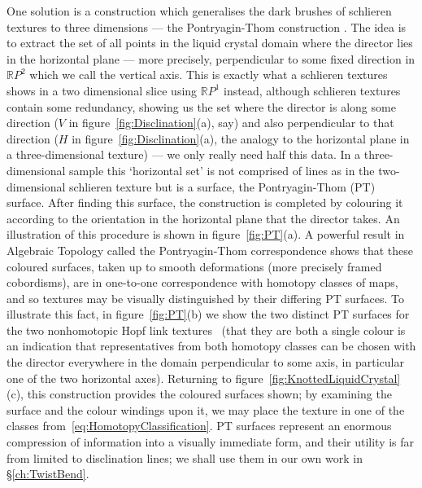 One solution is a construction which generalises the dark brushes of schlieren textures to three dimensions --- the Pontryagin-Thom construction \citep{ChenThesis,Chen2013,MachonThesis,AlexanderBook}. The idea is to extract the set of all points in the liquid crystal domain where the director lies in the  horizontal plane --- more precisely, perpendicular to some fixed direction in $\mathbb{R}P^2$ which we call the vertical axis. This is exactly what a schlieren textures shows in a two dimensional slice using $\mathbb{R}P^1$ instead, although schlieren textures contain some redundancy, showing us the set where the director is along some direction ($V$ in figure~\ref{fig:Disclination}(a), say) and also perpendicular to that direction ($H$ in figure~\ref{fig:Disclination}(a), the analogy to the horizontal plane in a three-dimensional texture)  --- we only really need half this data. In a three-dimensional sample this `horizontal set' is not comprised of lines as in the two-dimensional schlieren texture but is a surface, the Pontryagin-Thom (PT) surface. After finding this surface, the construction is completed by colouring it according to the orientation in the horizontal plane that the director takes. An illustration of this procedure is shown in figure~\ref{fig:PT}(a). A powerful result in Algebraic Topology called the Pontryagin-Thom correspondence \citep{Milnor1997,Hatcher2012} shows that these coloured surfaces, taken up to smooth deformations (more precisely framed cobordisms), are in one-to-one correspondence with homotopy classes of maps, and so textures may be visually distinguished by their differing PT surfaces. To illustrate this fact, in figure~\ref{fig:PT}(b) we show the two distinct PT surfaces for the two nonhomotopic Hopf link textures~\citep{MachonThesis} (that they are both a single colour is an indication that representatives from both homotopy classes can be chosen with the director everywhere in the domain perpendicular to some axis, in particular one of the two horizontal axes). Returning to figure~\ref{fig:KnottedLiquidCrystal}(c), this construction provides the coloured surfaces shown; by examining the surface and the colour windings upon it, we may place the texture in one of the classes from~\eqref{eq:HomotopyClassification}. PT surfaces represent an enormous compression of information into a visually immediate form, and their utility is far from limited to disclination lines; we shall use them in our own work in \S\ref{ch:TwistBend}.

